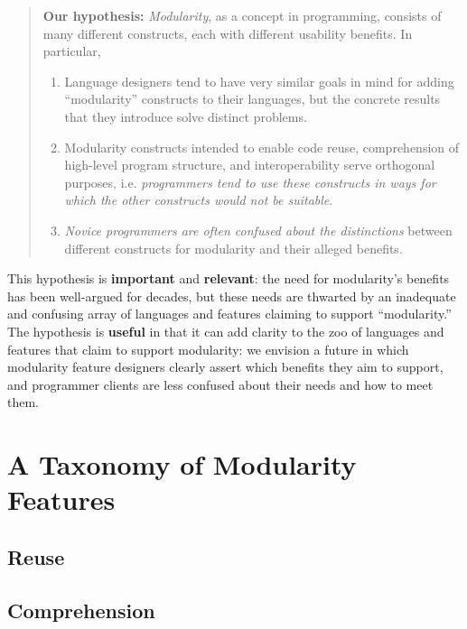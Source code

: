 \documentclass{sigplanconf}
\begin{document}
\begin{quote}
  {\bf Our hypothesis:}
  {\em Modularity}, as a concept in programming, consists of many different
  constructs, each with different usability benefits. In particular,
  \begin{enumerate}
    \item Language designers tend to have very similar goals in mind for
      adding ``modularity'' constructs to their languages, but the concrete
      results that they introduce solve distinct problems.
    \item Modularity constructs intended to enable code reuse,
      comprehension of high-level program structure, and interoperability
      serve orthogonal purposes, i.e. {\em programmers tend to use these
      constructs in ways for which the other constructs would not be
      suitable}.
    \item {\em Novice programmers are often confused about the
      distinctions} between different constructs for modularity and their
      alleged benefits. 
  \end{enumerate}
\end{quote}

This hypothesis is {\bf important} and {\bf relevant}: the need for
modularity's benefits has been well-argued for decades, but these needs are
thwarted by an inadequate and confusing array of languages and features
claiming to support ``modularity.'' The hypothesis is {\bf useful} in that
it can add clarity to the zoo of languages and features that claim to
support modularity: we envision a future in which modularity feature
designers clearly assert which benefits they aim to support, and programmer
clients are less confused about their needs and how to meet them. 
 


\section{A Taxonomy of Modularity Features}

\subsection{Reuse}

\subsection{Comprehension}
\end{document}
